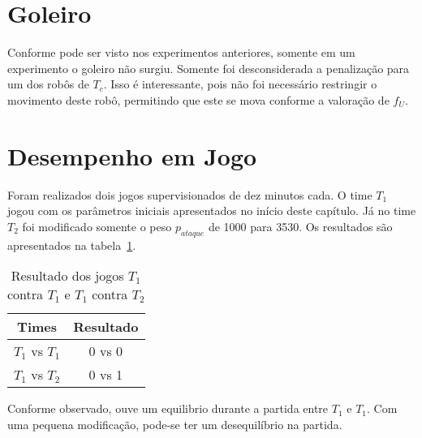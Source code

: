 
%
%
%




\section{Goleiro}
Conforme pode ser visto nos experimentos anteriores,
somente em um experimento o goleiro não surgiu.
Somente foi desconsiderada a penalização para um
dos robôs de $T_c$. Isso é interessante, pois
não foi necessário restringir o movimento deste
robô, permitindo que este se mova conforme a
valoração de $f_U$.

\section{Desempenho em Jogo}
Foram realizados dois jogos supervisionados de dez minutos cada.
O time $T_1$ jogou com os parâmetros iniciais apresentados no
início deste capítulo. Já no time $T_2$ foi modificado
somente o peso $p_{ataque}$ de 1000 para 3530. Os resultados são apresentados
na tabela~\ref{tab:games}.

\begin{table}[H]
  \begin{center}
  \begin{tabular}{|c|c|}
    \hline
    Times      & Resultado \\
    \hline
    $T_1$ vs $T_1$ &  0 vs 0   \\
    \hline
    $T_1$ vs $T_2$ &  0 vs 1   \\
    \hline
  \end{tabular}
  \caption{Resultado dos jogos $T_1$ contra $T_1$ e $T_1$ contra $T_2$}\label{tab:games}
  \end{center}
\end{table}

Conforme observado, ouve um equilibrio durante a
partida entre $T_1$ e $T_1$. Com uma pequena
modificação, pode-se ter um desequilíbrio na
partida.
